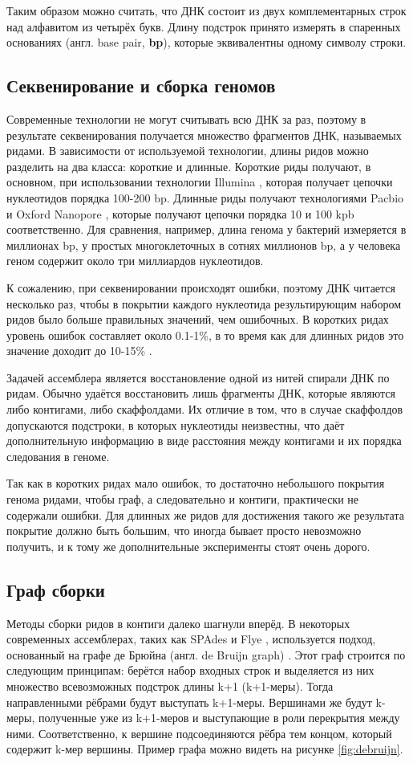 \documentclass[14pt]{matmex-diploma-custom}
\begin{document}
Таким образом можно считать, что ДНК состоит из двух комплементарных строк над алфавитом из четырёх букв. Длину подстрок принято измерять в спаренных основаниях (англ. base pair, \textbf{bp}), которые эквивалентны одному символу строки.

\subsection{Секвенирование и сборка геномов}
Современные технологии не могут считывать всю ДНК за раз, поэтому в результате секвенирования получается множество фрагментов ДНК, называемых ридами. В зависимости от используемой технологии, длины ридов можно разделить на два класса: короткие и длинные. Короткие риды получают, в основном, при использовании технологии Illumina \cite{art:reads}, которая получает цепочки нуклеотидов порядка 100-200 bp. Длинные риды получают технологиями Pacbio и Oxford Nanopore \cite{art:reads}, которые получают цепочки порядка 10 и 100 kpb соответственно. Для сравнения, например, длина генома у бактерий измеряется в миллионах bp, у простых многоклеточных в сотнях миллионов bp, а у человека геном содержит около три миллиардов нуклеотидов.

К сожалению, при секвенировании происходят ошибки, поэтому ДНК читается несколько раз, чтобы в покрытии каждого нуклеотида результирующим набором ридов было больше правильных значений, чем ошибочных. В коротких ридах уровень ошибок составляет около 0.1-1\%, в то время как для длинных ридов это значение доходит до 10-15\% \cite{art:reads}.

Задачей ассемблера является восстановление одной из нитей спирали ДНК по ридам. Обычно удаётся  восстановить лишь фрагменты ДНК, которые являются либо контигами, либо скаффолдами. Их отличие в том, что в случае скаффолдов допускаются подстроки, в которых нуклеотиды неизвестны, что даёт дополнительную информацию в виде расстояния между контигами и их порядка следования в геноме.

Так как в коротких ридах мало ошибок, то достаточно небольшого покрытия генома ридами, чтобы граф, а следовательно и контиги, практически не содержали ошибки. Для длинных же ридов для достижения такого же результата покрытие должно быть большим, что иногда бывает просто невозможно получить, и к тому же дополнительные эксперименты стоят очень дорого.

\subsection{Граф сборки}
Методы сборки ридов в контиги далеко шагнули вперёд. В некоторых современных ассемблерах, таких как SPAdes \cite{art:SPAdes} и Flye \cite{art:flye}, используется подход, основанный на графе де Брюйна (англ. de Bruijn graph) \cite{art:Pevzner}. Этот граф строится по следующим принципам: берётся набор входных строк и выделяется из них множество всевозможных подстрок длины k+1 (k+1-меры). Тогда направленными рёбрами будут выступать k+1-меры. Вершинами же будут k-меры, полученные уже из k+1-меров и выступающие в роли перекрытия между ними. Соответственно, к вершине подсоединяются рёбра тем концом, который содержит k-мер вершины. Пример графа можно видеть на рисунке \ref{fig:debruijn}.
\end{document}
